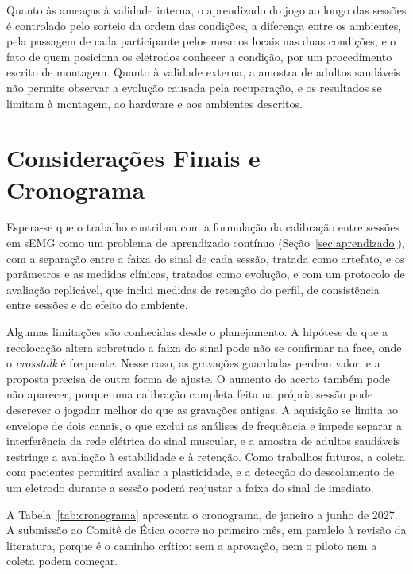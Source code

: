\documentclass[runningheads]{llncs}
\begin{document}
Quanto às ameaças à validade interna, o aprendizado do jogo ao longo das sessões é controlado pelo sorteio da ordem das condições, a diferença entre os ambientes, pela passagem de cada participante pelos mesmos locais nas duas condições, e o fato de quem posiciona os eletrodos conhecer a condição, por um procedimento escrito de montagem. Quanto à validade externa, a amostra de adultos saudáveis não permite observar a evolução causada pela recuperação, e os resultados se limitam à montagem, ao hardware e aos ambientes descritos.

\section{Considerações Finais e Cronograma}\label{sec:conclusao}

Espera-se que o trabalho contribua com a formulação da calibração entre sessões em sEMG como um problema de aprendizado contínuo (Seção~\ref{sec:aprendizado}), com a separação entre a faixa do sinal de cada sessão, tratada como artefato, e os parâmetros e as medidas clínicas, tratados como evolução, e com um protocolo de avaliação replicável, que inclui medidas de retenção do perfil, de consistência entre sessões e do efeito do ambiente.

Algumas limitações são conhecidas desde o planejamento. A hipótese de que a recolocação altera sobretudo a faixa do sinal pode não se confirmar na face, onde o \textit{crosstalk} é frequente. Nesse caso, as gravações guardadas perdem valor, e a proposta precisa de outra forma de ajuste. O aumento do acerto também pode não aparecer, porque uma calibração completa feita na própria sessão pode descrever o jogador melhor do que as gravações antigas. A aquisição se limita ao envelope de dois canais, o que exclui as análises de frequência e impede separar a interferência da rede elétrica do sinal muscular, e a amostra de adultos saudáveis restringe a avaliação à estabilidade e à retenção. Como trabalhos futuros, a coleta com pacientes permitirá avaliar a plasticidade, e a detecção do descolamento de um eletrodo durante a sessão poderá reajustar a faixa do sinal de imediato.

A Tabela~\ref{tab:cronograma} apresenta o cronograma, de janeiro a junho de 2027. A submissão ao Comitê de Ética ocorre no primeiro mês, em paralelo à revisão da literatura, porque é o caminho crítico: sem a aprovação, nem o piloto nem a coleta podem começar.
\end{document}
